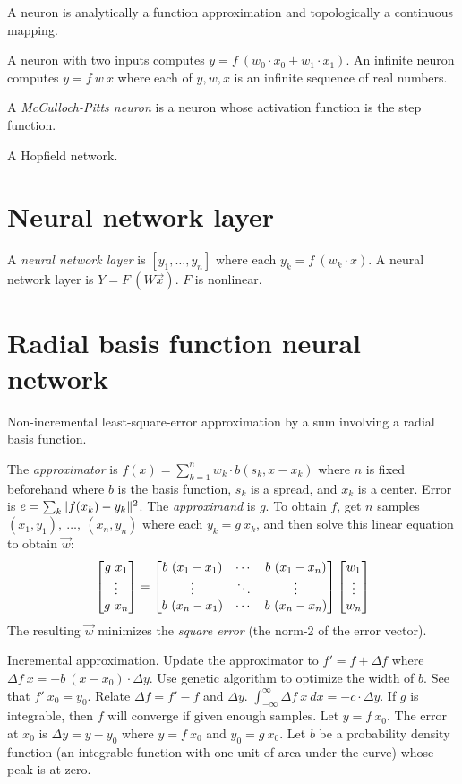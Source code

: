 A neuron is analytically a function approximation
and topologically a continuous mapping.

A neuron with two inputs computes \(y = f~(w_0 \cdot x_0 + w_1 \cdot x_1)\).
An infinite neuron computes \(y = f~w~x\)
where each of \(y,w,x\) is an infinite sequence of real numbers.

%
%
A \emph{McCulloch-Pitts neuron} is a neuron whose activation function is the step function.

A Hopfield network.

\section{Neural network layer}

A \emph{neural network layer} is
\([y_1,\ldots,y_n]\) where each \(y_k = f~(w_k \cdot x) \).
A neural network layer is
\(Y = F~(W \vec{x}) \).
\(F\) is nonlinear.

\section{Radial basis function neural network}

Non-incremental least-square-error approximation by a sum involving a radial basis function.

The \emph{approximator} is \(f(x) = \sum_{k=1}^n w_k \cdot b(s_k,x-x_k)\)
where \(n\) is fixed beforehand
where \(b\) is the basis function,
\(s_k\) is a spread,
and \(x_k\) is a center.
Error is \(e = \sum_k \lVert f(x_k) - y_k\rVert^2\).
The \emph{approximand} is \(g\).
To obtain \(f\),
get \(n\) samples \((x_1,y_1), ~ \ldots , ~ (x_n,y_n)\) where each \(y_k = g~x_k\),
and then
solve this linear equation to obtain \(\vec{w}\):
\begin{align}
    \begin{bmatrix}g~x_1 \\ \vdots \\ g~x_n\end{bmatrix} = \begin{bmatrix}b~(x_1-x_1) & \cdots & b~(x_1-x_n) \\ \vdots & \ddots & \vdots \\ b~(x_n-x_1) & \cdots & b~(x_n-x_n)\end{bmatrix} \begin{bmatrix}w_1 \\ \vdots \\ w_n\end{bmatrix}
\end{align}
The resulting \(\vec{w}\) minimizes the
\emph{square error} (the norm-2 of the error vector).

Incremental approximation.
Update the approximator to \(f' = f + \Delta f\)
where
\(\Delta f~x = - b ~ (x - x_0) \cdot \Delta y\).
Use genetic algorithm to optimize the width of \(b\).
See that \(f'~x_0 = y_0\).
Relate \(\Delta f = f' - f\) and \(\Delta y\).
\(\int_{-\infty}^\infty \Delta f~x ~ dx = - c \cdot \Delta y\).
If \(g\) is integrable, then \(f\) will converge if given enough samples.
Let \(y = f~x_0\).
The error at \(x_0\) is \(\Delta y = y - y_0\)
where \(y = f~x_0\) and \(y_0 = g~x_0\).
Let \(b\) be a probability density function (an integrable function with one unit of area under the curve) whose peak is at zero.


